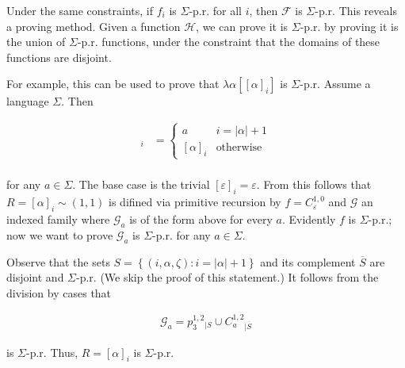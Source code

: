 \documentclass[a4paper, 12pt]{article}
\begin{document}
Under the same constraints, if $f_i$ is $\Sigma$-p.r. for all $i$, then
$\mathcal{F}$ is $\Sigma$-p.r. This reveals a proving method. Given a function
$\mathcal{H}$, we can prove it is $\Sigma$-p.r. by proving it is the union of
$\Sigma$-p.r. functions, under the constraint that the domains of these
functions are disjoint.

For example, this can be used to prove that $\lambda \alpha\left[ \left[ \alpha
\right]_i  \right] $ is $\Sigma$-p.r. Assume a language $\Sigma$. Then

\begin{align*}
    [\alpha a]_i &= \begin{cases}
        a & i = |\alpha| + 1 \\ 
        [\alpha]_i & \text{otherwise}
    \end{cases}\\
\end{align*}

for any $a \in \Sigma$. The base case is the trivial $[\varepsilon]_i = \varepsilon$.
From this follows  that $R = [\alpha]_i \sim (1, 1)$ is difined via primitive recursion by
$f = C_{\varepsilon}^{1, 0}$ and $\mathcal{G}$ an indexed family where
$\mathcal{G}_a$ is of the form above for every $a$. Evidently $f$ is
$\Sigma$-p.r.; now we want to prove $\mathcal{G}_a$ is $\Sigma$-p.r. for any $a
\in \Sigma$.


Observe that the sets $S = \left\{ (i, \alpha, \zeta) : i = |\alpha| + 1 \right\} $
and its complement $\overline{S}$ are disjoint and $\Sigma$-p.r. (We skip the
proof of this statement.) It follows from the division by cases that

\begin{align*}
    \mathcal{G}_a = p_3^{1, 2}_{\mid S} \cup C_{a}^{1, 2}_{\mid \overline{S}}
\end{align*}

is $\Sigma$-p.r. Thus, $R = [\alpha]_i$ is $\Sigma$-p.r.
\end{document}
